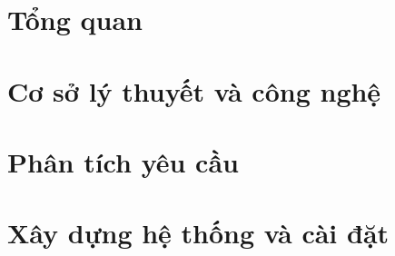 \documentclass[a4paper,12pt,oneside]{report}
\theoremstyle{definition}
\begin{document}
\newpage
\pagestyle{fancy} %
\chapter{Tổng quan}


\newpage
\pagestyle{fancy} %
\chapter{Cơ sở lý thuyết và công nghệ}


\newpage
\pagestyle{fancy} %
\chapter{Phân tích yêu cầu}


\newpage
\pagestyle{fancy} %
\chapter{Xây dựng hệ thống và cài đặt}


\newpage
{}
\nocite{*} %
\pagestyle{plain}
\printbibliography %
\end{document}
